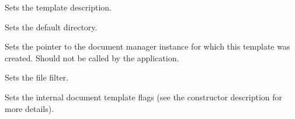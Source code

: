Sets the template description.

\label{wxdoctemplatesetdirectory}


Sets the default directory.

\label{wxdoctemplatesetdocumentmanager}


Sets the pointer to the document manager instance for which this template was created.
Should not be called by the application.

\label{wxdoctemplatesetfilefilter}


Sets the file filter.

\label{wxdoctemplatesetflags}


Sets the internal document template flags (see the constructor description for more details).

